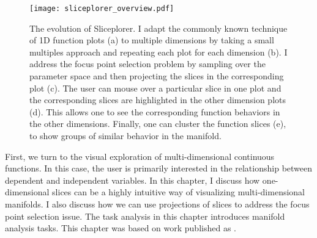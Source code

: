 
\begin{figure}
  \centering
  \texttt{[image: sliceplorer\_overview.pdf]}
  \caption[The evolution of Sliceplorer.]{%
    The evolution of Sliceplorer. I adapt the commonly known technique of
    1D function plots (a) to
    multiple dimensions by taking a small multiples approach and repeating each
    plot for each dimension (b). I address the
    focus point selection problem by sampling over the parameter space and then
    projecting the slices in the corresponding plot
    (c). The user can mouse over a particular
    slice in one plot and the corresponding slices are highlighted in the other
    dimension plots (d). This allows one to
    see the corresponding function behaviors in the other dimensions.  Finally,
    one can cluster the function slices (e), to
    show groups of similar behavior in the manifold.
  }
  \label{fig:walkthrough}
\end{figure}

First, we turn to the visual exploration of multi-dimensional continuous
functions. In this case, the user is primarily interested in the relationship
between dependent and independent variables. In this chapter, I discuss how
one-dimensional slices can be a highly intuitive way of visualizing
multi-dimensional manifolds. I also discuss how we can use projections of 
slices to address the focus point selection issue. The task analysis in this
chapter introduces manifold analysis tasks.
This chapter was based on work published as .











